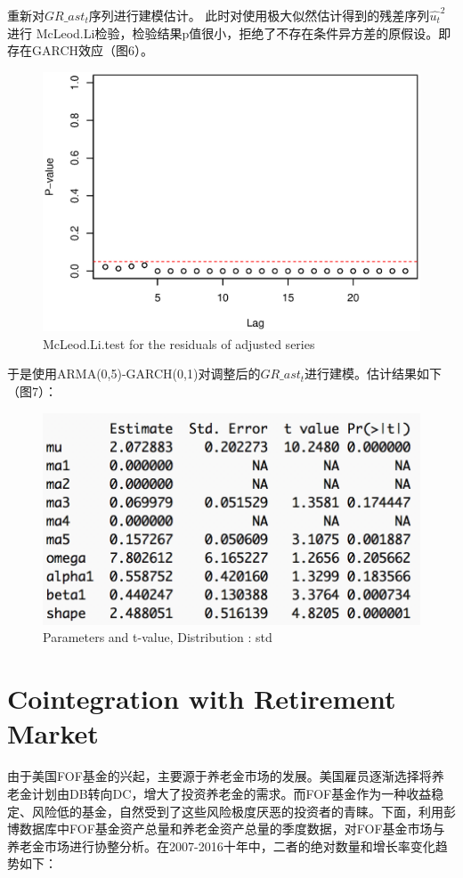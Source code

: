 \documentclass[10pt]{article}
\begin{document}
重新对${GR\_ast_t}$序列进行建模估计。
此时对使用极大似然估计得到的残差序列${\hat{u_t}^2}$进行 McLeod.Li检验，检验结果p值很小，拒绝了不存在条件异方差的原假设。即存在GARCH效应（图6）。
\begin{figure}
	\centering
	\includegraphics[width=0.5\linewidth]{pic/mcr2}
	\caption{McLeod.Li.test for the residuals of adjusted series}
	\label{fig:mcr2}
\end{figure}

于是使用ARMA(0,5)-GARCH(0,1)对调整后的${GR\_ast_{t}}$进行建模。估计结果如下（图7）：

\begin{figure}
	\centering
	\includegraphics[width=0.7\linewidth]{pic/astgarch}
	\caption{Parameters and t-value,  Distribution	: std }
	\label{fig:astg}
\end{figure}

\section{Cointegration with Retirement Market}
由于美国FOF基金的兴起，主要源于养老金市场的发展。美国雇员逐渐选择将养老金计划由DB转向DC，增大了投资养老金的需求。而FOF基金作为一种收益稳定、风险低的基金，自然受到了这些风险极度厌恶的投资者的青睐。下面，利用彭博数据库中FOF基金资产总量和养老金资产总量的季度数据，对FOF基金市场与养老金市场进行协整分析。在2007-2016十年中，二者的绝对数量和增长率变化趋势如下：
\end{document}

